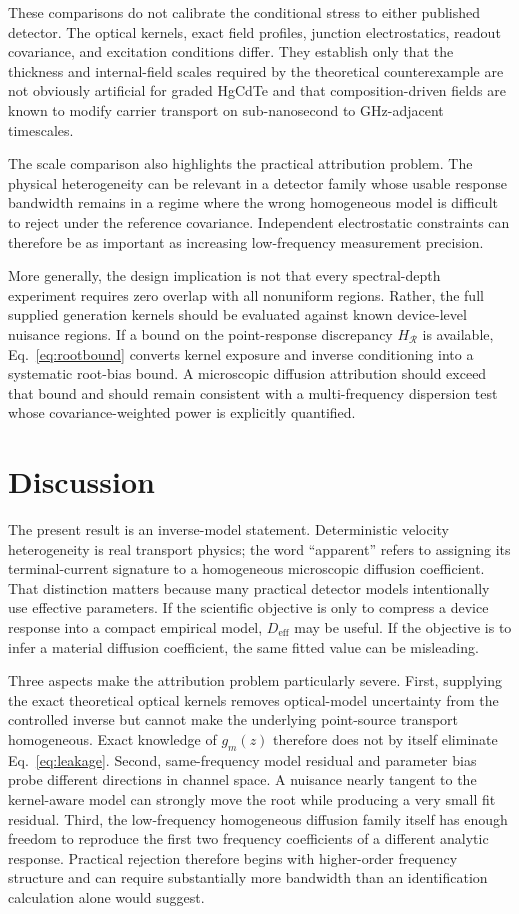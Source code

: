 \documentclass[aps,pra,twocolumn,superscriptaddress,nofootinbib]{revtex4-2}
\newcommand{\Deff}{D_{\mathrm{eff}}}
\newcommand{\Rregion}{\mathcal{R}}
\begin{document}
These comparisons do not calibrate the conditional stress to either published detector. The optical kernels, exact field profiles, junction electrostatics, readout covariance, and excitation conditions differ. They establish only that the thickness and internal-field scales required by the theoretical counterexample are not obviously artificial for graded HgCdTe and that composition-driven fields are known to modify carrier transport on sub-nanosecond to GHz-adjacent timescales.

The scale comparison also highlights the practical attribution problem. The physical heterogeneity can be relevant in a detector family whose usable response bandwidth remains in a regime where the wrong homogeneous model is difficult to reject under the reference covariance. Independent electrostatic constraints can therefore be as important as increasing low-frequency measurement precision.

More generally, the design implication is not that every spectral-depth experiment requires zero overlap with all nonuniform regions. Rather, the full supplied generation kernels should be evaluated against known device-level nuisance regions. If a bound on the point-response discrepancy $H_{\Rregion}$ is available, Eq.~\eqref{eq:rootbound} converts kernel exposure and inverse conditioning into a systematic root-bias bound. A microscopic diffusion attribution should exceed that bound and should remain consistent with a multi-frequency dispersion test whose covariance-weighted power is explicitly quantified.

\section{Discussion}

The present result is an inverse-model statement. Deterministic velocity heterogeneity is real transport physics; the word ``apparent'' refers to assigning its terminal-current signature to a homogeneous microscopic diffusion coefficient. That distinction matters because many practical detector models intentionally use effective parameters. If the scientific objective is only to compress a device response into a compact empirical model, $\Deff$ may be useful. If the objective is to infer a material diffusion coefficient, the same fitted value can be misleading.

Three aspects make the attribution problem particularly severe. First, supplying the exact theoretical optical kernels removes optical-model uncertainty from the controlled inverse but cannot make the underlying point-source transport homogeneous. Exact knowledge of $g_m(z)$ therefore does not by itself eliminate Eq.~\eqref{eq:leakage}. Second, same-frequency model residual and parameter bias probe different directions in channel space. A nuisance nearly tangent to the kernel-aware model can strongly move the root while producing a very small fit residual. Third, the low-frequency homogeneous diffusion family itself has enough freedom to reproduce the first two frequency coefficients of a different analytic response. Practical rejection therefore begins with higher-order frequency structure and can require substantially more bandwidth than an identification calculation alone would suggest.
\end{document}
